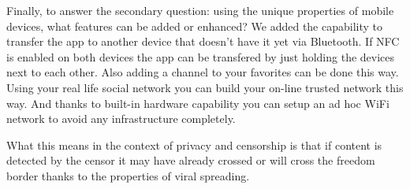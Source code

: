 Finally, to answer the secondary question: using the unique properties of mobile devices, what features can be added or enhanced?
We added the capability to transfer the app to another device that doesn't have it yet via Bluetooth.
If NFC is enabled on both devices the app can be transfered by just holding the devices next to each other.
Also adding a channel to your favorites can be done this way.
Using your real life social network you can build your on-line trusted network this way.
And thanks to built-in hardware capability you can setup an ad hoc WiFi network to avoid any infrastructure completely.


What this means in the context of privacy and censorship is that if content is detected by the censor it may have already crossed or will cross the freedom border thanks to the properties of viral spreading.


